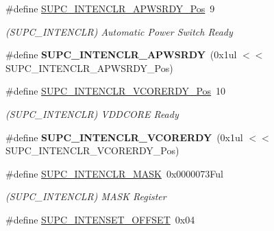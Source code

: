 \begin{DoxyCompactItemize}
\item 
\hypertarget{group___s_a_m_l21___s_u_p_c_ga8602fbf7b2bd0b2c50b5fb1c67564c95}{}\#define \hyperlink{group___s_a_m_l21___s_u_p_c_ga8602fbf7b2bd0b2c50b5fb1c67564c95}{S\+U\+P\+C\+\_\+\+I\+N\+T\+E\+N\+C\+L\+R\+\_\+\+A\+P\+W\+S\+R\+D\+Y\+\_\+\+Pos}~9\label{group___s_a_m_l21___s_u_p_c_ga8602fbf7b2bd0b2c50b5fb1c67564c95}

\begin{DoxyCompactList}\small\item\em (S\+U\+P\+C\+\_\+\+I\+N\+T\+E\+N\+C\+L\+R) Automatic Power Switch Ready \end{DoxyCompactList}\item 
\hypertarget{group___s_a_m_l21___s_u_p_c_gaed97378db0343beb4d98f37d29ff8114}{}\#define {\bfseries S\+U\+P\+C\+\_\+\+I\+N\+T\+E\+N\+C\+L\+R\+\_\+\+A\+P\+W\+S\+R\+D\+Y}~(0x1ul $<$$<$ S\+U\+P\+C\+\_\+\+I\+N\+T\+E\+N\+C\+L\+R\+\_\+\+A\+P\+W\+S\+R\+D\+Y\+\_\+\+Pos)\label{group___s_a_m_l21___s_u_p_c_gaed97378db0343beb4d98f37d29ff8114}

\item 
\hypertarget{group___s_a_m_l21___s_u_p_c_ga8c8604b4d2609d6b82ea0a6b230cc09a}{}\#define \hyperlink{group___s_a_m_l21___s_u_p_c_ga8c8604b4d2609d6b82ea0a6b230cc09a}{S\+U\+P\+C\+\_\+\+I\+N\+T\+E\+N\+C\+L\+R\+\_\+\+V\+C\+O\+R\+E\+R\+D\+Y\+\_\+\+Pos}~10\label{group___s_a_m_l21___s_u_p_c_ga8c8604b4d2609d6b82ea0a6b230cc09a}

\begin{DoxyCompactList}\small\item\em (S\+U\+P\+C\+\_\+\+I\+N\+T\+E\+N\+C\+L\+R) V\+D\+D\+C\+O\+R\+E Ready \end{DoxyCompactList}\item 
\hypertarget{group___s_a_m_l21___s_u_p_c_ga370f2074aa3fe3f4529cf5bbc83711b2}{}\#define {\bfseries S\+U\+P\+C\+\_\+\+I\+N\+T\+E\+N\+C\+L\+R\+\_\+\+V\+C\+O\+R\+E\+R\+D\+Y}~(0x1ul $<$$<$ S\+U\+P\+C\+\_\+\+I\+N\+T\+E\+N\+C\+L\+R\+\_\+\+V\+C\+O\+R\+E\+R\+D\+Y\+\_\+\+Pos)\label{group___s_a_m_l21___s_u_p_c_ga370f2074aa3fe3f4529cf5bbc83711b2}

\item 
\hypertarget{group___s_a_m_l21___s_u_p_c_ga06458e4ed63f79761f95064da8896f5b}{}\#define \hyperlink{group___s_a_m_l21___s_u_p_c_ga06458e4ed63f79761f95064da8896f5b}{S\+U\+P\+C\+\_\+\+I\+N\+T\+E\+N\+C\+L\+R\+\_\+\+M\+A\+S\+K}~0x0000073\+Ful\label{group___s_a_m_l21___s_u_p_c_ga06458e4ed63f79761f95064da8896f5b}

\begin{DoxyCompactList}\small\item\em (S\+U\+P\+C\+\_\+\+I\+N\+T\+E\+N\+C\+L\+R) M\+A\+S\+K Register \end{DoxyCompactList}\item 
\hypertarget{group___s_a_m_l21___s_u_p_c_gac6edb7e9d646fce1d152b001eb7c3498}{}\#define \hyperlink{group___s_a_m_l21___s_u_p_c_gac6edb7e9d646fce1d152b001eb7c3498}{S\+U\+P\+C\+\_\+\+I\+N\+T\+E\+N\+S\+E\+T\+\_\+\+O\+F\+F\+S\+E\+T}~0x04\label{group___s_a_m_l21___s_u_p_c_gac6edb7e9d646fce1d152b001eb7c3498}


\end{DoxyCompactItemize}
